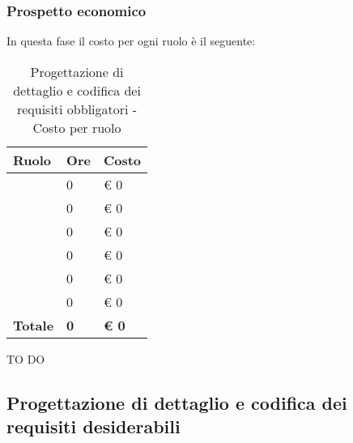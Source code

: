 		\subsubsection{Prospetto economico} %
		\label{ssub:prospetto_economico}
		In questa fase il costo per ogni ruolo è il seguente: \\
			\begin{table}[!h]
				\begin{center}
					\begin{tabularx}{0.6\textwidth}{|l|l|X|}
						\hline
						\textbf{Ruolo} & \textbf{Ore} & \textbf{Costo} \\
						\hline
						\roleProjectManager & 0 & \euro{} 0 \\
						\hline
						\roleAnalyst & 0 & \euro{} 0 \\
						\hline
						\roleDesigner & 0 & \euro{} 0 \\
						\hline
						\roleAdministrator & 0 & \euro{} 0 \\
						\hline
						\roleProgrammer & 0 & \euro{} 0 \\
						\hline
						\roleVerifier & 0 & \euro{} 0 \\
						\hline
						\textbf{Totale} & \textbf{0} & \textbf{\euro{} 0} \\
						\hline
					\end{tabularx}
				\end{center}
			\caption{Progettazione di dettaglio e codifica dei requisiti obbligatori - Costo per ruolo}
			\end{table}
		
		\noindent
		TO DO
		
	
	\subsection{Progettazione di dettaglio e codifica dei requisiti desiderabili} %
	\label{sub:progettazione_di_dettaglio_e_codifica_dei_requisiti_desiderabili}
